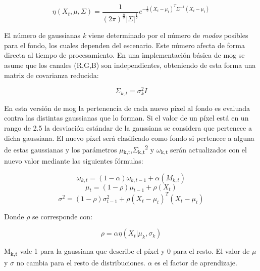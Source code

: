 \begin{equation}\label{eta_formula}
\eta(X_{t},\mu,\Sigma) = \frac{1}{(2\pi)^{\frac{n}{2}}|\Sigma|^{\frac{1}{2}}}e^{-\frac{1}{2}(X_{t}-\mu_{t})^{T}\Sigma^{-1}(X_{t}-\mu_{t})}
\end{equation}

El número de gaussianas \textit{k} viene determinado por el número de \textit{modos} posibles para el fondo, los cuales dependen del escenario. Este número afecta de forma directa  al  tiempo  de  procesamiento. En una implementación básica de \acrshort{mog} se  asume que los canales (R,G,B) son independientes, obteniendo de esta forma una matriz de covarianza reducida:

\begin{equation}\label{covarianza_formula}
\Sigma_{k,t}=\sigma_{k}^2I
\end{equation}

En esta versión de \acrshort{mog} la pertenencia de cada nuevo píxel al fondo es evaluada contra las distintas gaussianas que lo forman. Si el valor de un píxel está en un rango de 2.5 la desviación estándar de la gaussiana se considera que pertenece a dicha gaussiana. El nuevo píxel será clasificado como fondo si pertenece a alguna de estas gaussianas y los parámetros $\mu$\textsubscript{k,t},$\Sigma$\textsubscript{k,t}\textsuperscript{2} y $\omega$\textsubscript{k,t} serán actualizados con el nuevo valor mediante las siguientes fórmulas:

\begin{equation}\label{gaussiana_formula1}
\omega_{k,t}=(1-\alpha)\omega_{k,t-1}+\alpha(M_{k,t})
\end{equation}
\begin{equation}\label{gaussiana_formula2}
\mu_{t}=(1-\rho)\mu_{t-1}+\rho(X_{t})
\end{equation}
\begin{equation}\label{gaussiana_formula3}
\sigma^2=(1-\rho)\sigma_{t-1}^2+\rho(X_{t}-\mu_{t})^T(X_{t}-\mu_{t})
\end{equation}

Donde $\rho$ se corresponde con:

\begin{equation}\label{ro_formula}
\rho=\alpha\eta(X_{t}|\mu_{k},\sigma_{k})
\end{equation}

M\textsubscript{k,t} vale 1 para la gaussiana que describe el píxel y 0 para el resto. El valor de $\mu$ y $\sigma$ no cambia para el resto de distribuciones. $\alpha$ es el factor de aprendizaje.

